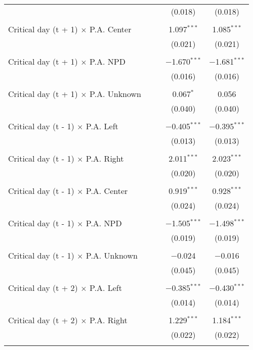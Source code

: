 \documentclass[
]{article}
\begin{document}
\begin{table}[!htbp]
{\begin{tabular}{@{\extracolsep{5pt}}lcccc}
  &  &  & (0.018) & (0.018) \\ 
  & & & & \\ 
 Critical day (t + 1) $\times$ P.A. Center &  &  & 1.097$^{***}$ & 1.085$^{***}$ \\ 
  &  &  & (0.021) & (0.021) \\ 
  & & & & \\ 
 Critical day (t + 1) $\times$ P.A. NPD &  &  & $-$1.670$^{***}$ & $-$1.681$^{***}$ \\ 
  &  &  & (0.016) & (0.016) \\ 
  & & & & \\ 
 Critical day (t + 1) $\times$ P.A. Unknown &  &  & 0.067$^{*}$ & 0.056 \\ 
  &  &  & (0.040) & (0.040) \\ 
  & & & & \\ 
 Critical day (t - 1) $\times$ P.A. Left &  &  & $-$0.405$^{***}$ & $-$0.395$^{***}$ \\ 
  &  &  & (0.013) & (0.013) \\ 
  & & & & \\ 
 Critical day (t - 1) $\times$ P.A. Right &  &  & 2.011$^{***}$ & 2.023$^{***}$ \\ 
  &  &  & (0.020) & (0.020) \\ 
  & & & & \\ 
 Critical day (t - 1) $\times$ P.A. Center &  &  & 0.919$^{***}$ & 0.928$^{***}$ \\ 
  &  &  & (0.024) & (0.024) \\ 
  & & & & \\ 
 Critical day (t - 1) $\times$ P.A. NPD &  &  & $-$1.505$^{***}$ & $-$1.498$^{***}$ \\ 
  &  &  & (0.019) & (0.019) \\ 
  & & & & \\ 
 Critical day (t - 1) $\times$ P.A. Unknown &  &  & $-$0.024 & $-$0.016 \\ 
  &  &  & (0.045) & (0.045) \\ 
  & & & & \\ 
 Critical day (t + 2) $\times$ P.A. Left &  &  & $-$0.385$^{***}$ & $-$0.430$^{***}$ \\ 
  &  &  & (0.014) & (0.014) \\ 
  & & & & \\ 
 Critical day (t + 2) $\times$ P.A. Right &  &  & 1.229$^{***}$ & 1.184$^{***}$ \\ 
  &  &  & (0.022) & (0.022) \\ 
  & & & & \\ 

\end{tabular}}
\end{table}
\end{document}
